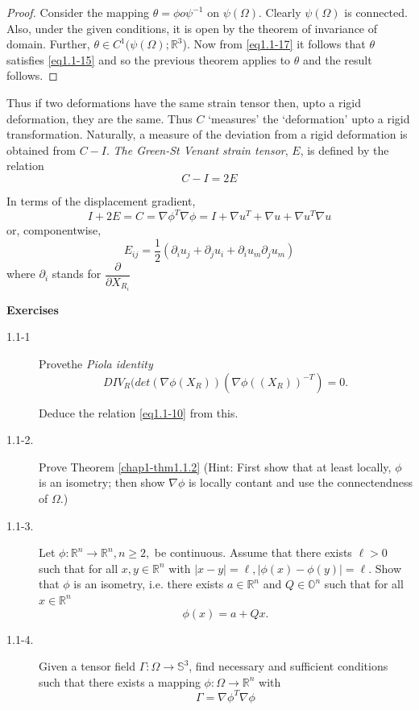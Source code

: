 \begin{proof}
Consider the mapping $\theta = \phi o \psi^{-1}$ on
$\psi(\Omega)$. Clearly $\psi (\Omega)$ is connected. Also, under the
given conditions, it is open by the theorem of invariance of
domain. Further, $\theta \in C^1 (\psi (\Omega); \mathbb{R}^3$). Now
from \eqref{eq1.1-17} it follows that $\theta$ satisfies
\eqref{eq1.1-15} and so the previous theorem applies to $\theta$ and
the result follows.  
\end{proof}

Thus if two deformations have the same strain tensor then, upto a
rigid deformation, they are the same. Thus $C$ `measures' the
`deformation' upto a rigid transformation. Naturally, a measure of the
deviation from a rigid deformation is obtained from $C -
I$. \textit{The Green-St Venant strain tensor},  $E$, is defined by the relation 
\begin{equation*}
C - I = 2 E \tag{1.1-19}\label{eq1.1-19}
\end{equation*}

In terms of the displacement gradient, 
$$
I + 2 E = C = \nabla  \phi^T \nabla  \phi = I +
\nabla u^T + \nabla u + \nabla u^T
\nabla u 
$$
or, componentwise, 
\begin{equation*}
E_{ij} = \frac{1}{2}(\partial _i u_j + \partial_j u_i + \partial_i u_m
\partial_j u_m) \tag{1.1-20} \label{eq1.1-20}
\end{equation*}
where $\partial_i$ stands for $\dfrac{\partial}{\partial X_{R_i}}$

\medskip
\begin{center}
{\large\bf{Exercises}}
\end{center}

\begin{description}
\item[1.1-1] Prove\pageoriginale  the \textit{Piola identity}
$$
DIV_R (det (\nabla  \phi (X_R)) (\nabla  \phi((X_R))^{-T}) = 0.
$$

Deduce the relation \eqref{eq1.1-10} from this.

\item[1.1-2.] Prove Theorem \ref{chap1-thm1.1.2} (Hint: First show
  that at least 
locally, $\phi$ is an isometry; then show $\nabla  \phi$ is
locally contant and use the connectendness of $\Omega$.) 
 
\item[1.1-3.] Let $\phi : \mathbb{R}^n \to \mathbb{R}^n , n \geq 2, $
 be continuous. Assume that there exists $\ell > 0$ such that for all
 $x, y \in \mathbb{R}^n$ with $|x - y| = \ell , |\phi (x) - \phi (y)|
 = \ell$. Show that $\phi$ is an isometry, i.e. there exists $a \in
 \mathbb{R}^n$ and $Q \in \mathbb{O}^n$ such that for all $x \in 
 \mathbb{R}^n$ 
 $$
 \phi (x) = a + Qx.
 $$

\item[1.1-4.] Given a tensor field $\Gamma : \Omega \to
 \mathbb{S}^3$, find necessary and sufficient conditions such that
 there exists a mapping $\phi : \Omega \to \mathbb{R}^n$ with 
 $$
 \Gamma = \nabla  \phi^T \nabla  \phi 
 $$
\end{description}

